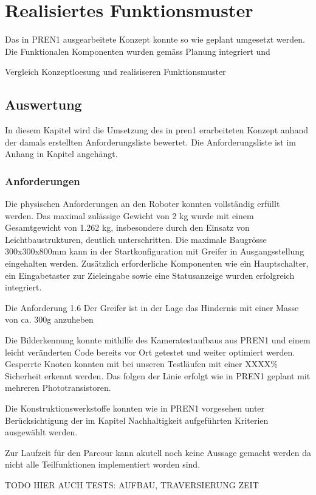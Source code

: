 \section{Realisiertes Funktionsmuster}

Das in PREN1 ausgearbeitete Konzept konnte so wie geplant umgesetzt werden. Die Funktionalen Komponenten wurden gemäss Planung integriert und 

Vergleich  Konzeptloesung und realisiseren Funktionsmuster



\subsection{Auswertung}

In diesem Kapitel wird die Umsetzung des in \acrshort{pren1} erarbeiteten Konzept anhand der damals erstellten Anforderungsliste bewertet. Die Anforderungsliste ist im Anhang in Kapitel  angehängt.

\subsubsection{Anforderungen}
Die physischen Anforderungen an den Roboter konnten vollständig erfüllt werden. Das maximal zulässige Gewicht von 2 kg wurde mit einem Gesamtgewicht von 1.262 kg, insbesondere durch den Einsatz von Leichtbaustrukturen, deutlich unterschritten. Die maximale Baugrösse 300x300x800mm kann in der Startkonfiguration mit Greifer in Ausgangsstellung eingehalten werden. Zusätzlich erforderliche Komponenten wie ein Hauptschalter, ein Eingabetaster zur Zieleingabe sowie eine Statusanzeige wurden erfolgreich integriert.

Die Anforderung 1.6 Der Greifer ist in der Lage das Hindernis mit einer Masse von ca. 300g anzuheben


Die Bilderkennung konnte mithilfe des Kameratestaufbaus aus PREN1 und einem leicht veränderten Code bereits vor Ort getestet und weiter optimiert werden. Gesperrte Knoten konnten mit bei unseren Testläufen mit einer XXXX\% Sicherheit erkennt werden. Das folgen der Linie erfolgt wie in PREN1 geplant mit mehreren Phototransistoren. 

Die Konstruktionswerkstoffe konnten wie in PREN1 vorgesehen unter Berücksichtigung der im Kapitel Nachhaltigkeit aufgeführten Kriterien ausgewählt werden.

Zur Laufzeit für den Parcour kann akutell noch keine Aussage gemacht werden da nicht alle Teilfunktionen implementiert worden sind. 



TODO HIER AUCH TESTS: AUFBAU, TRAVERSIERUNG ZEIT